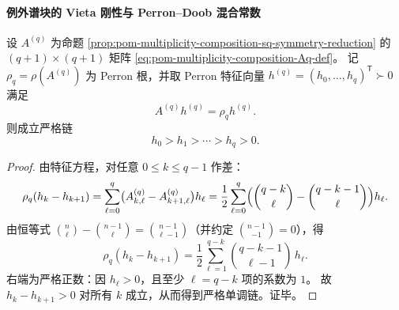 %
%

\paragraph{例外谱块的 Vieta 刚性与 Perron--Doob 混合常数}

\begin{theorem}\label{thm:pom-replica-softcore-exceptional-perron-hamming-monotone}
设 \(A^{(q)}\) 为命题 \ref{prop:pom-multiplicity-composition-sq-symmetry-reduction} 的 \((q+1)\times(q+1)\) 矩阵 \eqref{eq:pom-multiplicity-composition-Aq-def}。
记 \(\rho_q=\rho(A^{(q)})\) 为 Perron 根，并取 Perron 特征向量 \(h^{(q)}=(h_0,\dots,h_q)^{\mathsf T}\succ 0\) 满足
\[
A^{(q)}h^{(q)}=\rho_q h^{(q)}.
\]
则成立严格链
\[
h_0>h_1>\cdots>h_q>0.
\]
\end{theorem}
\begin{proof}
由特征方程，对任意 \(0\le k\le q-1\) 作差：
\[
\rho_q(h_k-h_{k+1})
=\sum_{\ell=0}^{q}\bigl(A^{(q)}_{k,\ell}-A^{(q)}_{k+1,\ell}\bigr)h_\ell
=\frac12\sum_{\ell=0}^{q}\Bigl(\binom{q-k}{\ell}-\binom{q-k-1}{\ell}\Bigr)h_\ell.
\]
由恒等式 \(\binom{n}{\ell}-\binom{n-1}{\ell}=\binom{n-1}{\ell-1}\)（并约定 \(\binom{n-1}{-1}=0\)），得
\[
\rho_q(h_k-h_{k+1})
=\frac12\sum_{\ell=1}^{q-k}\binom{q-k-1}{\ell-1}\,h_\ell.
\]
右端为严格正数：因 \(h_\ell>0\)，且至少 \(\ell=q-k\) 项的系数为 \(1\)。
故 \(h_k-h_{k+1}>0\) 对所有 \(k\) 成立，从而得到严格单调链。证毕。
\end{proof}

